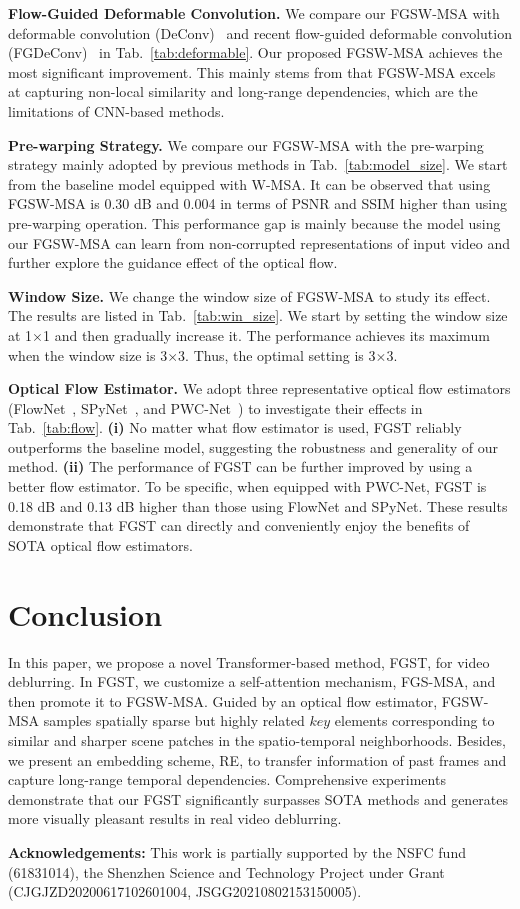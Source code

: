 \documentclass{article}
\begin{document}
	\noindent\textbf{Flow-Guided Deformable Convolution.} We compare our FGSW-MSA with deformable convolution (DeConv)~\cite{edvr} and recent flow-guided deformable convolution (FGDeConv)~\cite{chan2021basicvsr++} in Tab.~\ref{tab:deformable}. Our proposed FGSW-MSA achieves the most significant improvement. This mainly stems from that FGSW-MSA excels at capturing non-local similarity and long-range dependencies, which are the limitations of CNN-based methods.
	
	\noindent\textbf{Pre-warping Strategy.} We compare our FGSW-MSA with the pre-warping strategy mainly adopted by previous methods in Tab.~\ref{tab:model_size}. We start from the baseline model equipped with W-MSA. It can be observed that using FGSW-MSA is 0.30 dB and 0.004 in terms of PSNR and SSIM higher than using pre-warping operation. This performance gap is mainly because the model using our FGSW-MSA can learn from non-corrupted representations of input video and further  explore the guidance effect of the optical flow.
	
	\noindent\textbf{Window Size.} We change the window size of FGSW-MSA to study its effect. The results are listed in Tab.~\ref{tab:win_size}. We start by setting the window size at 1$\times$1 and then gradually increase it. The performance  achieves its maximum when the window size is 3$\times$3. Thus, the optimal setting is 3$\times$3.
	
	
	
	\noindent\textbf{Optical Flow Estimator.} We adopt three representative optical flow estimators (FlowNet~\cite{flownet}, SPyNet~\cite{spynet}, and PWC-Net~\cite{pwcnet}) to investigate their effects in Tab.~\ref{tab:flow}. \textbf{(i)} No matter what flow estimator is used, FGST reliably outperforms the baseline model, suggesting the robustness and generality of our method. \textbf{(ii)} The performance of FGST can be further improved by using a better flow estimator. To be specific, when equipped with PWC-Net, FGST is 0.18 dB and 0.13 dB higher than those using FlowNet and SPyNet. These results demonstrate that FGST can directly and conveniently enjoy the benefits of SOTA optical flow estimators.
	
	\vspace{-2mm}
	\section{Conclusion}
	\vspace{-1mm}
	In this paper, we propose a novel  Transformer-based method, FGST, for video deblurring. In FGST, we customize a self-attention mechanism, FGS-MSA, and then promote it to FGSW-MSA. Guided by an optical flow estimator, FGSW-MSA samples spatially sparse but highly related $key$ elements corresponding to similar and sharper scene patches in the spatio-temporal neighborhoods. Besides, we present an embedding scheme, RE, to transfer information of past frames and capture long-range temporal dependencies. Comprehensive experiments demonstrate that our FGST significantly surpasses SOTA methods and generates more visually pleasant results in real video deblurring.
	
	
	\textbf{Acknowledgements:} This work is partially supported by the NSFC fund (61831014), the Shenzhen Science and Technology Project under Grant (CJGJZD20200617102601004, JSGG20210802153150005).
	
	
	
\end{document}
